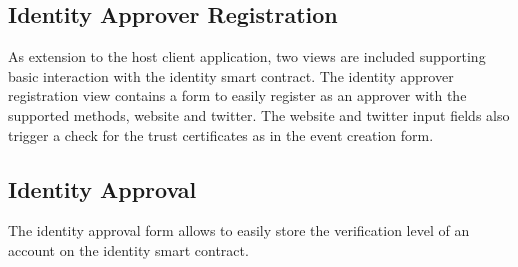 \subsection{Identity Approver Registration}
As extension to the host client application, two views are included supporting basic interaction with the identity smart contract. The identity approver registration view contains a form to easily register as an approver with the supported methods, website and twitter. The website and twitter input fields also trigger a check for the trust certificates as in the event creation form.

\subsection{Identity Approval}
The identity approval form allows to easily store the verification level of an account on the identity smart contract.


